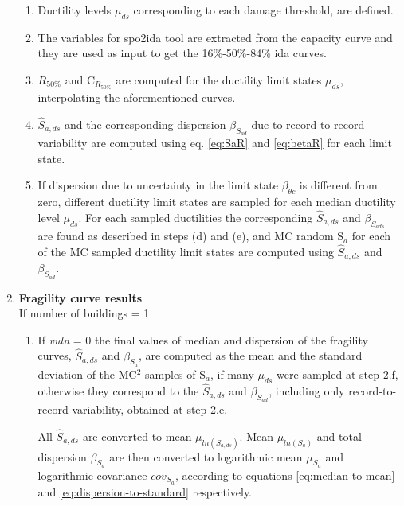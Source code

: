 \begin{enumerate}
\begin{enumerate}
\item Ductility levels $\mu_{ds}$ corresponding to each damage threshold, are defined.

\item The variables for spo2ida tool are extracted from the capacity curve and they are used as input to get the 16\%-50\%-84\% ida curves.

\item $R_{50\%}$ and C$_{R_{50\%}}$ are computed for the ductility limit states $\mu_{ds}$, interpolating the aforementioned curves.

\item $\hat{S}_{a,ds}$ and the corresponding dispersion $\beta_{S_{a d}}$ due to record-to-record variability are computed using eq. \ref{eq:SaR} and \ref{eq:betaR} for each limit state.

\item If dispersion due to uncertainty in the limit state $\beta_{\theta c}$ is different from zero, different ductility limit states are sampled for each median ductility level $\mu_{ds}$. For each sampled ductilities the corresponding $\hat{S}_{a,ds}$ and $\beta_{S_{a ds}}$ are found as described in steps (d) and (e), and MC random S$_a$ for each of the MC sampled ductility limit states are computed using $\hat{S}_{a,ds}$ and $\beta_{S_{a d}}$.\\

\end{enumerate}

\item \textbf{Fragility curve results}\\
If number of buildings = 1\\
\begin{enumerate}
\item If \textit{vuln} = 0
the final values of median and dispersion of the fragility curves, $\hat{S}_{a,ds}$ and $\beta_{S_a}$, are computed as the mean and the standard deviation of the MC$^2$ samples of S$_a$, if many $\mu_{ds}$ were sampled at step 2.f, otherwise they correspond to the $\hat{S}_{a,ds}$ and $\beta_{S_{a d}}$, including only record-to-record variability, obtained at step 2.e.

All $\hat{S}_{a, ds}$ are converted to mean $\mu_{ln(S_{a, ds})}$. Mean $\mu_{ln(S_{a})}$ and total dispersion $\beta_{S_a}$ are then converted to logarithmic mean $\mu_{S_a}$ and logarithmic covariance $cov_{S_a}$, according to equations \ref{eq:median-to-mean} and \ref{eq:dispersion-to-standard} respectively.


\end{enumerate}
\end{enumerate}
